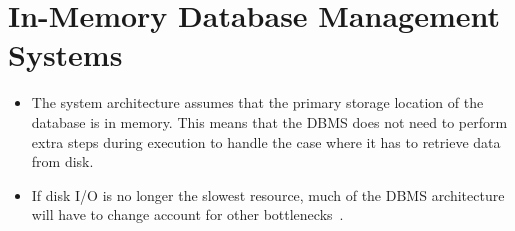 \documentclass[11pt]{article}
\begin{document}
\section{In-Memory Database Management Systems}
\begin{itemize}
    \item
    The system architecture assumes that the primary storage location of the database is in 
    memory. This means that the DBMS does not need to perform extra steps during execution to 
    handle the case where it has to retrieve data from disk.
    
    
    \item
    If disk I/O is no longer the slowest resource, much of the DBMS architecture will have to 
    change account for other bottlenecks~\cite{stonebraker2007}.
    

\end{itemize}
\end{document}
